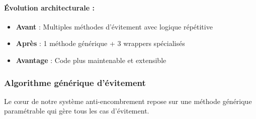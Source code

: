 \documentclass[12pt,a4paper]{article}
\begin{document}
\paragraph{Évolution architecturale :}
\begin{itemize}
    \item \textbf{Avant} : Multiples méthodes d'évitement avec logique répétitive
    \item \textbf{Après} : 1 méthode générique + 3 wrappers spécialisés
    \item \textbf{Avantage} : Code plus maintenable et extensible
\end{itemize}

\subsubsection{Algorithme générique d'évitement}

Le cœur de notre système anti-encombrement repose sur une méthode générique paramétrable qui gère tous les cas d'évitement.
\end{document}
